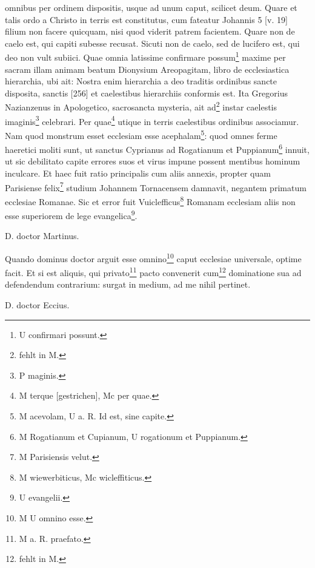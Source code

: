 omnibus per ordinem dispositis, usque ad unum caput, scilicet deum. Quare et talis ordo a Christo in terris est constitutus, cum fateatur Johannis 5 [v. 19] filium non facere quicquam, nisi quod viderit patrem facientem. Quare non de caelo est, qui capiti subesse recusat. Sicuti non de caelo, sed de lucifero est, qui deo non vult subiici. Quae omnia latissime confirmare possum\footnote{U confirmari possunt.} maxime per sacram illam animam beatum Dionysium Areopagitam, libro de ecclesiastica hierarchia, ubi ait: Nostra enim hierarchia a deo traditis ordinibus sancte disposita, sanctis [256] et caelestibus hierarchiis conformis est. Ita Gregorius Nazianzenus in Apologetico, sacrosancta mysteria, ait ad\footnote{fehlt in M.} instar caelestis imaginis\footnote{P maginis.} celebrari. Per quae\footnote{M terque [gestrichen], Mc per quae.} utique in terris caelestibus ordinibus associamur. Nam quod monstrum esset ecclesiam esse acephalam\footnote{M acevolam, U a. R. Id est, sine capite.}: quod omnes ferme haeretici moliti sunt, ut sanctus Cyprianus ad Rogatianum et Puppianum\footnote{M Rogatianum et Cupianum, U rogationum et Puppianum.} innuit, ut sic debilitato capite errores suos et virus impune possent mentibus hominum inculcare. Et haec fuit ratio principalis cum aliis annexis, propter quam Parisiense felix\footnote{M Parisiensis velut.} studium Johannem Tornacensem damnavit, negantem primatum ecclesiae Romanae. Sic et error fuit Vuiclefficus\footnote{M wiewerbiticus, Mc wicleffiticus.} Romanam ecclesiam aliis non esse superiorem de lege evangelica\footnote{U evangelii.}.

D. doctor Martinus.

Quando dominus doctor arguit esse omnino\footnote{M U omnino esse.} caput ecclesiae universale, optime facit. Et si est aliquis, qui privato\footnote{M a. R. praefato.} pacto convenerit cum\footnote{fehlt in M.} dominatione sua ad defendendum contrarium: surgat in medium, ad me nihil pertinet.

D. doctor Eccius.

